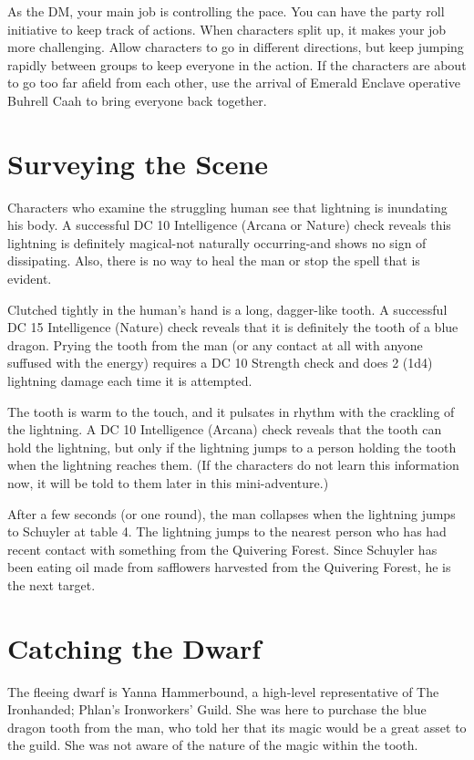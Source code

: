 \documentclass[10pt,a4paper,twoside,bg=print,twocolumn,openany,nodeprecatedcode]{dndbook}
\begin{document}
As the DM, your main job is controlling the pace. You can have the party roll initiative to keep track of actions. When characters split up, it makes your job more challenging. Allow characters to go in different directions, but keep jumping rapidly between groups to keep everyone in the action. If the characters are about to go too far afield from each other, use the arrival of Emerald Enclave operative Buhrell Caah to bring everyone back together.

\section{Surveying the Scene}
Characters who examine the struggling human see that lightning is inundating his body. A successful DC 10 Intelligence (Arcana or Nature) check reveals this lightning is definitely magical-not naturally occurring-and shows no sign of dissipating. Also, there is no way to heal the man or stop the spell that is evident.

Clutched tightly in the human's hand is a long, dagger-like tooth. A successful DC 15 Intelligence (Nature) check reveals that it is definitely the tooth of a blue dragon. Prying the tooth from the man (or any contact at all with anyone suffused with the energy) requires a DC 10 Strength check and does 2 (1d4) lightning damage each time it is attempted.

The tooth is warm to the touch, and it pulsates in rhythm with the crackling of the lightning. A DC 10 Intelligence (Arcana) check reveals that the tooth can hold the lightning, but only if the lightning jumps to a person holding the tooth when the lightning reaches them. (If the characters do not learn this information now, it will be told to them later in this mini-adventure.)

After a few seconds (or one round), the man collapses when the lightning jumps to Schuyler at table 4. The lightning jumps to the nearest person who has had recent contact with something from the Quivering Forest. Since Schuyler has been eating oil made from safflowers harvested from the Quivering Forest, he is the next target.

\section{Catching the Dwarf}
The fleeing dwarf is Yanna Hammerbound, a high-level representative of The Ironhanded; Phlan's Ironworkers' Guild. She was here to purchase the blue dragon tooth from the man, who told her that its magic would be a great asset to the guild. She was not aware of the nature of the magic within the tooth.
\end{document}
